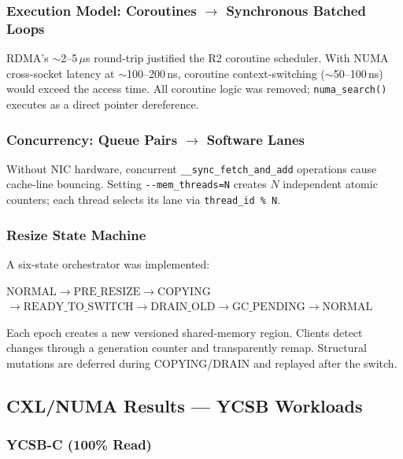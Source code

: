\documentclass[11pt,a4paper]{article}
\begin{document}
\subsubsection{Execution Model: Coroutines $\to$ Synchronous Batched Loops}
RDMA's $\sim$2--5\,$\mu$s round-trip justified the R2 coroutine scheduler. With NUMA cross-socket latency at $\sim$100--200\,ns, coroutine context-switching ($\sim$50--100\,ns) would exceed the access time. All coroutine logic was removed; \texttt{numa\_search()} executes as a direct pointer dereference.

\subsubsection{Concurrency: Queue Pairs $\to$ Software Lanes}
Without NIC hardware, concurrent \texttt{\_\_sync\_fetch\_and\_add} operations cause cache-line bouncing. Setting \texttt{-{}-mem\_threads=N} creates $N$ independent atomic counters; each thread selects its lane via \texttt{thread\_id \% N}.

\subsubsection{Resize State Machine}\label{sec:resize-sm}
A six-state orchestrator was implemented:
\begin{center}
\small
$\text{NORMAL} \to \text{PRE\_RESIZE} \to \text{COPYING}$ \\
$\to \text{READY\_TO\_SWITCH} \to \text{DRAIN\_OLD} \to \text{GC\_PENDING} \to \text{NORMAL}$
\end{center}
Each epoch creates a new versioned shared-memory region. Clients detect changes through a generation counter and transparently remap. Structural mutations are deferred during COPYING/DRAIN and replayed after the switch.

\subsection{CXL/NUMA Results --- YCSB Workloads}

\subsubsection{YCSB-C (100\% Read)}
\end{document}
